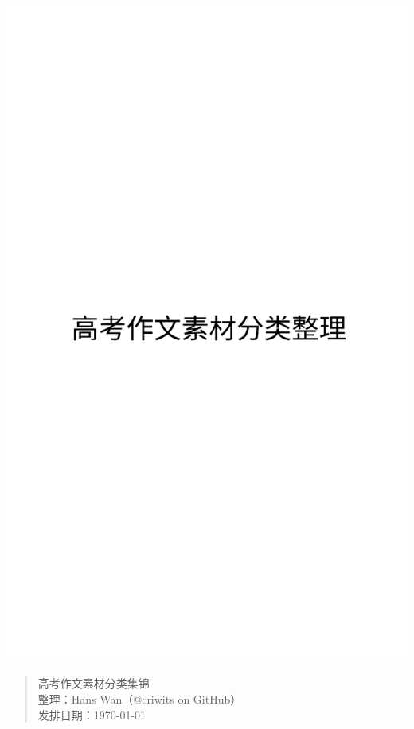 \thispagestyle{empty}
\includegraphics{cover}

\newpage\thispagestyle{empty}
\begin{quote}
高考作文素材分类集锦\\
整理：Hans Wan（@criwits on GitHub）\\
发排日期：\today
\end{quote}
\
